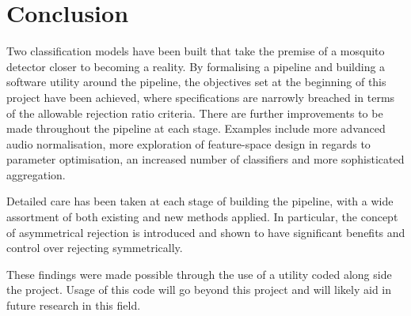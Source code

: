 \section{Conclusion}
\label{sec:conc-conc}
    Two classification models have been built that take the premise of a mosquito detector closer to becoming a reality. By formalising a pipeline and building a software utility around the pipeline, the objectives set at the beginning of this project have been achieved, where specifications are narrowly breached in terms of the allowable rejection ratio criteria. There are further improvements to be made throughout the pipeline at each stage. Examples include more advanced audio normalisation, more exploration of feature-space design in regards to parameter optimisation, an increased number of classifiers and more sophisticated aggregation.
    
    Detailed care has been taken at each stage of building the pipeline, with a wide assortment of both existing and new methods applied. In particular, the concept of asymmetrical rejection is introduced and shown to have significant benefits and control over rejecting symmetrically. 

    These findings were made possible through the use of a utility coded along side the project. Usage of this code will go beyond this project and will likely aid in future research in this field. 
